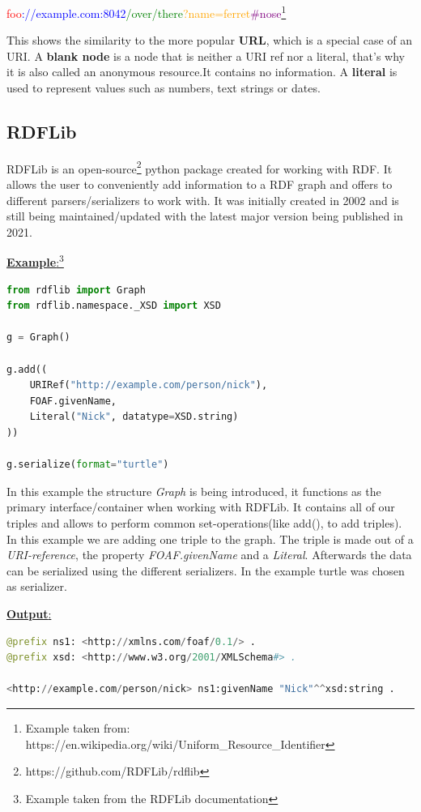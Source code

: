 \documentclass[12pt, oneside]{article}
\begin{document}
\begin{center}
    \textcolor{red}{foo}\textcolor{blue}{://example.com:8042}\textcolor{green}{/over/there}\textcolor{orange}{?name=ferret}\textcolor{purple}{\#nose}\footnote[6]{Example taken from: https://en.wikipedia.org/wiki/Uniform\_Resource\_Identifier}
\end{center}
This shows the similarity to the more popular \textbf{URL}, which is a special case of an URI.
A \textbf{blank node} is a node that is neither a URI ref nor a literal, that's why it is also called an anonymous resource.It contains no information. A \textbf{literal} is used to represent  values such as numbers, text strings or dates.
\newpage
\subsection{RDFLib}
RDFLib is an open-source\footnote{https://github.com/RDFLib/rdflib} python package created for working with RDF. It allows the user to conveniently add information to a RDF graph and offers to different parsers/serializers to work with. It was initially created in 2002 and is still being maintained/updated with the latest major version being published in 2021.

\bigskip

\underline{\textbf{Example}:}\footnote{Example taken from the RDFLib documentation}

\begin{lstlisting}[language=Python]
from rdflib import Graph
from rdflib.namespace._XSD import XSD

g = Graph()

g.add((
    URIRef("http://example.com/person/nick"),
    FOAF.givenName,
    Literal("Nick", datatype=XSD.string)
))

g.serialize(format="turtle")
\end{lstlisting}
In this example the structure \textit{Graph} is being introduced, it functions as the primary interface/container when working with RDFLib. It contains all of our triples and allows to perform common set-operations(like add(), to add triples). In this example we are adding one triple to the graph. The triple is made out of a \textit{URI-reference}, the property \textit{FOAF.givenName} and a \textit{Literal}.  Afterwards the data can be serialized using the different serializers. In the example turtle was chosen as serializer.

\underline{\textbf{Output}:}

\begin{lstlisting}[language=Python]
@prefix ns1: <http://xmlns.com/foaf/0.1/> .
@prefix xsd: <http://www.w3.org/2001/XMLSchema#> .

<http://example.com/person/nick> ns1:givenName "Nick"^^xsd:string .
\end{lstlisting}
\end{document}
